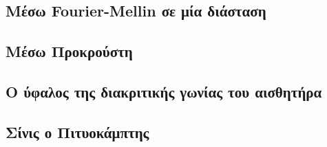 \subsection{Μέσω Fourier-Mellin σε μία διάσταση}
\label{subsection:02_04_02:02}

\subsection{Μέσω Προκρούστη}
\label{subsection:02_04_02:03}

\subsection{Ο ύφαλος της διακριτικής γωνίας του αισθητήρα}
\label{subsection:02_04_02:04}

\subsection{Σίνις ο Πιτυοκάμπτης}
\label{subsection:02_04_02:05}


